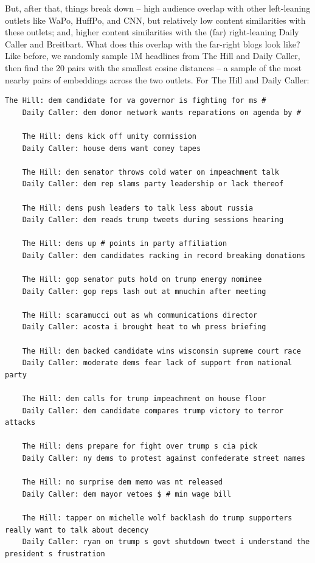 \documentclass{scrartcl}
\begin{document}
But, after that, things break down -- high audience overlap with other left-leaning outlets like WaPo, HuffPo, and CNN, but relatively low content similarities with these outlets; and, higher content similarities with the (far) right-leaning Daily Caller and Breitbart. What does this overlap with the far-right blogs look like? Like before, we randomly sample 1M headlines from The Hill and Daily Caller, then find the 20 pairs with the smallest cosine distances -- a sample of the most nearby pairs of embeddings across the two outlets. For The Hill and Daily Caller:

\begin{lstlisting}[basicstyle=\tiny\hlfont]
    The Hill: dem candidate for va governor is fighting for ms #
    Daily Caller: dem donor network wants reparations on agenda by #

    The Hill: dems kick off unity commission
    Daily Caller: house dems want comey tapes

    The Hill: dem senator throws cold water on impeachment talk
    Daily Caller: dem rep slams party leadership or lack thereof

    The Hill: dems push leaders to talk less about russia
    Daily Caller: dem reads trump tweets during sessions hearing

    The Hill: dems up # points in party affiliation
    Daily Caller: dem candidates racking in record breaking donations

    The Hill: gop senator puts hold on trump energy nominee
    Daily Caller: gop reps lash out at mnuchin after meeting

    The Hill: scaramucci out as wh communications director
    Daily Caller: acosta i brought heat to wh press briefing

    The Hill: dem backed candidate wins wisconsin supreme court race
    Daily Caller: moderate dems fear lack of support from national party

    The Hill: dem calls for trump impeachment on house floor
    Daily Caller: dem candidate compares trump victory to terror attacks

    The Hill: dems prepare for fight over trump s cia pick
    Daily Caller: ny dems to protest against confederate street names

    The Hill: no surprise dem memo was nt released
    Daily Caller: dem mayor vetoes $ # min wage bill

    The Hill: tapper on michelle wolf backlash do trump supporters really want to talk about decency
    Daily Caller: ryan on trump s govt shutdown tweet i understand the president s frustration


\end{lstlisting}
\end{document}
